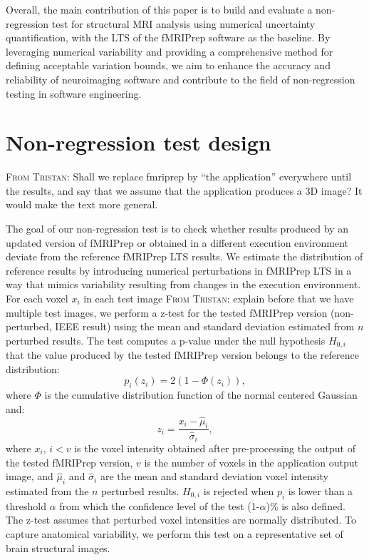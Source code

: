 \documentclass{article}
\newcommand{\TG}[1]{\color{blue}\textsc{From Tristan:} #1\color{black}\xspace}
\begin{document}
Overall, the main contribution of this paper is to build and evaluate a non-regression test for structural MRI analysis using numerical uncertainty quantification, with the LTS of the fMRIPrep software as the baseline. By leveraging numerical variability and providing a comprehensive method for defining acceptable variation bounds, we aim to enhance the accuracy and reliability of neuroimaging software and contribute to the field of non-regression testing in software engineering.

\section{Non-regression test design}

\TG{Shall we replace fmriprep by ``the application'' everywhere until the results, and say that we assume that the application produces a 3D image? It would make the text more general.}

The goal of our non-regression test is to check whether results produced by an updated version of fMRIPrep or obtained in a different execution environment deviate from the reference fMRIPrep LTS results. We estimate the distribution of reference results by introducing numerical perturbations in fMRIPrep LTS in a way that mimics variability resulting from changes in the execution environment.  For each voxel $x_i$ in each test image \TG{explain before that we have multiple test images}, we perform a z-test for the tested fMRIPrep version (non-perturbed, IEEE result) using the mean and standard deviation estimated from $n$ perturbed results. The test computes a p-value under the null hypothesis $H_{0,i}$ that the value produced by the tested fMRIPrep version belongs to the reference distribution:
\begin{equation}
    \label{eqn:pval}
    p_i(z_i) = 2 \left(1-\Phi(z_i)\right),
\end{equation}
where $\Phi$ is the cumulative distribution function of the normal centered
Gaussian and:
\begin{equation*}
    z_i = \frac{x_i-\hat \mu_i}{\hat \sigma_i},
\end{equation*}
where $x_i$, $i < v$ is the voxel intensity obtained after pre-processing the output of the tested fMRIPrep version, $v$ is the number of voxels in the application output image, and $\hat \mu_i$ and $\hat \sigma_i$ are the mean and standard deviation voxel intensity estimated from the $n$ perturbed results. $H_{0,i}$ is rejected when $p_i$ is lower than a threshold $\alpha$ from which the confidence level of the test (1-$\alpha$)\% is also defined. The z-test assumes that perturbed voxel intensities are normally distributed. To capture anatomical variability, we perform this test on a representative set of brain structural images.
\end{document}
